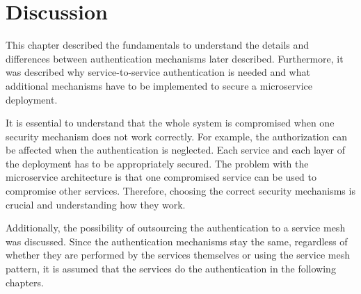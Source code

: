 \section{Discussion}
This chapter described the fundamentals to understand the details and differences between authentication mechanisms later described.
Furthermore, it was described why service-to-service authentication is needed and what additional mechanisms have to be implemented to secure a microservice deployment.

It is essential to understand that the whole system is compromised when one security mechanism does not work correctly.
For example, the authorization can be affected when the authentication is neglected.
Each service and each layer of the deployment has to be appropriately secured.
The problem with the microservice architecture is that one compromised service can be used to compromise other services.
Therefore, choosing the correct security mechanisms is crucial and understanding how they work.

Additionally, the possibility of outsourcing the authentication to a service mesh was discussed.
Since the authentication mechanisms stay the same, regardless of whether they are performed by the services themselves or using the service mesh pattern, it is assumed that the services do the authentication in the following chapters.
